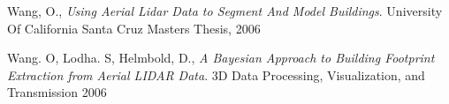 \documentclass{InsightArticle}
\begin{document}
\begin{thebibliography}{9}

	  Wang, O.,
	  \emph{Using Aerial Lidar Data to Segment And Model Buildings}.
	  University Of California Santa Cruz Masters Thesis, 2006


	  Wang. O, Lodha. S, Helmbold, D.,
	  \emph{A Bayesian Approach to Building Footprint Extraction from Aerial LIDAR Data}.
	  3D Data Processing, Visualization, and Transmission 2006

\end{thebibliography}
\end{document}
